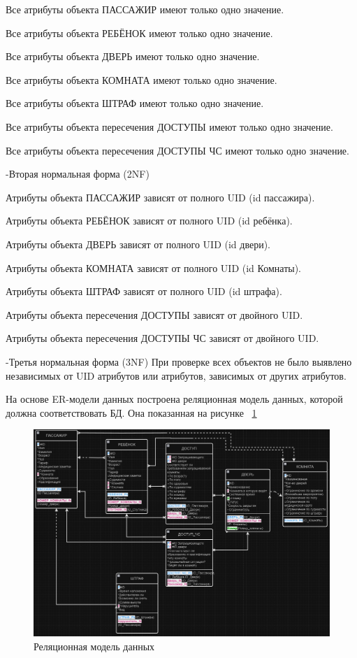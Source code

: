 Все атрибуты объекта ПАССАЖИР имеют только одно значение.

Все атрибуты объекта РЕБЁНОК имеют только одно значение.

Все атрибуты объекта ДВЕРЬ имеют только одно значение.

Все атрибуты объекта КОМНАТА имеют только одно значение.

Все атрибуты объекта ШТРАФ имеют только одно значение.

Все атрибуты объекта пересечения ДОСТУПЫ имеют только одно значение.

Все атрибуты объекта пересечения ДОСТУПЫ ЧС имеют только одно значение.


-Вторая нормальная форма (2NF)

Атрибуты объекта ПАССАЖИР зависят от полного UID (id пассажира).

Атрибуты объекта РЕБЁНОК зависят от полного UID (id ребёнка).

Атрибуты объекта ДВЕРЬ зависят от полного UID (id двери).

Атрибуты объекта КОМНАТА зависят от полного UID (id Комнаты).

Атрибуты объекта ШТРАФ зависят от полного UID (id штрафа).

Атрибуты объекта пересечения ДОСТУПЫ зависят от двойного UID.

Атрибуты объекта пересечения ДОСТУПЫ ЧС зависят от двойного UID.


-Третья нормальная форма (3NF)
При проверке всех объектов не было выявлено независимых от UID атрибутов или атрибутов, зависимых от других атрибутов.

На основе ER-модели данных построена реляционная модель данных, которой должна соответствовать БД. Она показанная на рисунке  ~\ref{fig:commonscheme3}

\begin{figure}[ht]
	\centering
	\includegraphics[width=1\linewidth]{images/CommonScheme3}
	\caption{Реляционная модель данных}
	\label{fig:commonscheme3}
\end{figure}

